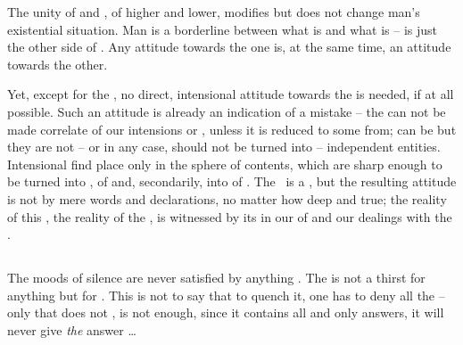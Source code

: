 \pa 
The  unity of  and , of {higher} 
and {lower}, modifies but does not change man's existential situation. 
Man is a borderline between what is  and what is 
--  is just the other side of .  Any
attitude towards the one is, at the same time, an attitude towards the
other.

Yet, except for the \sch, no direct, intensional attitude towards the
 is needed, if at all possible.  Such an attitude is
already an indication of a mistake -- the  can not be made
correlate of our intensions or , unless it is reduced to some
 from;  can be  but they
are not -- or in any case, should not be turned into -- independent
entities.  Intensional  find place only in the sphere of
 contents,  which are sharp enough to be
turned into ,  of  and,
secondarily, into  of .  The \sch\ is a
, but the resulting attitude is not 
by mere words and declarations, no matter how deep and true; the
reality of this , the reality of the ,
is witnessed by its  in our  of and
our dealings with the .


%
%


\subsection{}\label{sub:nonattach}

\say
The moods of silence are never satisfied by anything . 
The  is not a thirst for anything  but for 
. This is not to say that to quench it, one has 
to deny all the  -- only that  does 
not , is not enough, since it contains all and only 
answers, it will never give {\em the} answer \ldots

